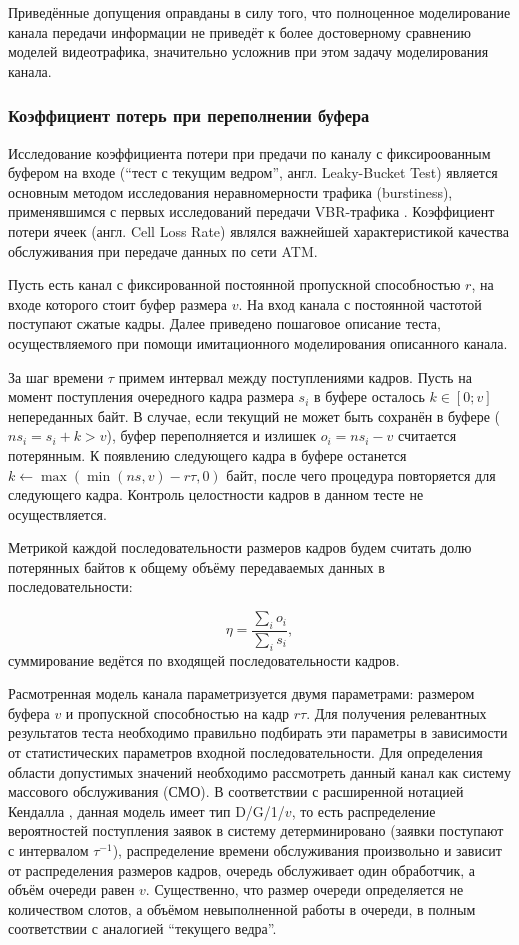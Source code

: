 Приведённые допущения оправданы в силу того, что полноценное моделирование
канала передачи информации не приведёт к более достоверному сравнению
моделей видеотрафика, значительно усложнив при этом задачу моделирования канала.


\subsubsection{Коэффициент потерь при переполнении буфера}
\hspace{3pt}

Исследование коэффициента потери при предачи по каналу
с фиксироованным буфером на входе (``тест с текущим ведром'',
англ. Leaky-Bucket Test) является основным
методом исследования неравномерности трафика (burstiness),
применявшимся с первых исследований передачи VBR-трафика
\cite{}.
Коэффициент потери ячеек (англ. Cell Loss Rate) являлся
важнейшей характеристикой качества обслуживания при передаче
данных по сети ATM.

Пусть есть канал с фиксированной постоянной пропускной
способностью $r$, на входе которого стоит буфер размера $v$.
На вход канала с постоянной частотой поступают сжатые
кадры. Далее приведено пошаговое описание теста, осуществляемого
при помощи имитационного моделирования описанного канала.

За шаг времени $\tau$ примем интервал между поступлениями
кадров. Пусть на момент поступления очередного кадра размера
$s_i$ в буфере осталось $k \in [0; v]$ непереданных байт.
В случае, если текущий не может быть сохранён
в буфере ($ns_i = s_i + k > v$), буфер переполняется и излишек $o_i = ns_i - v$
считается потерянным. К появлению следующего кадра
в буфере останется $k \leftarrow \max(\min(ns, v) - r\tau, 0)$ байт,
после чего процедура повторяется для следующего кадра.
Контроль целостности кадров в данном тесте не осуществляется.

Метрикой каждой последовательности размеров кадров будем считать
долю потерянных байтов к общему объёму передаваемых данных
в последовательности:

\begin{equation}
    \eta = \frac{\sum_i o_i}{\sum_i s_i},
\end{equation}
суммирование ведётся по входящей последовательности кадров.

Расмотренная модель канала параметризуется двумя параметрами:
размером буфера $v$ и пропускной способностью на кадр $r\tau$.
Для получения релевантных результатов теста необходимо правильно
подбирать эти параметры в зависимости от статистических параметров
входной последовательности. Для определения области допустимых значений
необходимо рассмотреть данный канал как систему массового обслуживания
\cite{}
(СМО). В соответствии с расширенной нотацией Кендалла
\cite{},
данная модель имеет тип D/G/1/$v$, то есть распределение
вероятностей поступления заявок в систему детерминировано
(заявки поступают с интервалом $\tau^{-1}$), распределение
времени обслуживания произвольно и зависит от распределения
размеров кадров, очередь обслуживает один обработчик,
а объём очереди равен $v$. Существенно, что размер очереди
определяется не количеством слотов, а объёмом невыполненной
работы в очереди, в полным соответствии с аналогией ``текущего
ведра''.

